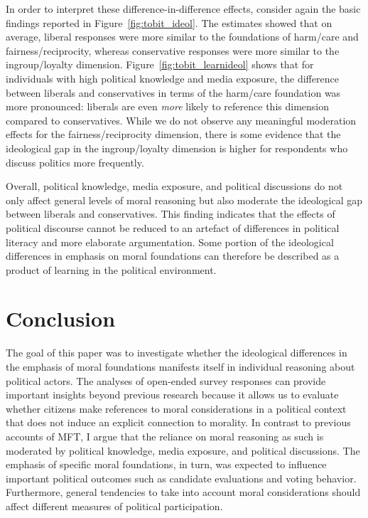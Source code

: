 \documentclass[12pt]{article}
\begin{document}
In order to interpret these difference-in-difference effects, consider again the basic findings reported in Figure~\ref{fig:tobit_ideol}. The estimates showed that on average, liberal responses were more similar to the foundations of harm/care and fairness/reciprocity, whereas conservative responses were more similar to the ingroup/loyalty dimension. Figure~\ref{fig:tobit_learnideol} shows that for individuals with high political knowledge and media exposure, the difference between liberals and conservatives in terms of the harm/care foundation was more pronounced: liberals are even \textit{more} likely to reference this dimension compared to conservatives. While we do not observe any meaningful moderation effects for the fairness/reciprocity dimension, there is some evidence that the ideological gap in the ingroup/loyalty dimension is higher for respondents who discuss politics more frequently.

\clearpage
Overall, political knowledge, media exposure, and political discussions do not only affect general levels of moral reasoning but also moderate the ideological gap between liberals and conservatives. This finding indicates that the effects of political discourse cannot be reduced to an artefact of differences in political literacy and more elaborate argumentation. Some portion of the ideological differences in emphasis on moral foundations can therefore be described as a product of learning in the political environment.




\section{Conclusion}

The goal of this paper was to investigate whether the ideological differences in the emphasis of moral foundations manifests itself in individual reasoning about political actors. The analyses of open-ended survey responses can provide important insights beyond previous research because it allows us to evaluate whether citizens make references to moral considerations in a political context that does not induce an explicit connection to morality. In contrast to previous accounts of MFT, I argue that the reliance on moral reasoning as such is moderated by political knowledge, media exposure, and political discussions. The emphasis of specific moral foundations, in turn, was expected to influence important political outcomes such as candidate evaluations and voting behavior. Furthermore, general tendencies to take into account moral considerations should affect different measures of political participation.
\end{document}
